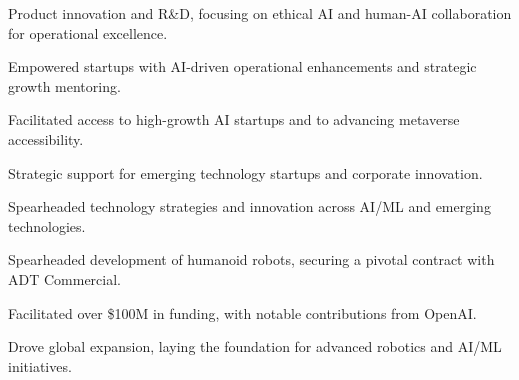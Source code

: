 \documentclass[11pt, letterpaper]{awesome-cv}
\begin{document}
\makecvheader

\begin{cventries}
    {
        \begin{cvitems}
            \item{Product innovation and R\&D, focusing on ethical AI and human-AI collaboration for operational excellence.}
        \end{cvitems}
    }

    {
        \begin{cvitems}
            \item{Empowered startups with AI-driven operational enhancements and strategic growth mentoring.}
            \item{Facilitated access to high-growth AI startups and to advancing metaverse accessibility.}
        \end{cvitems}
    }

    {
        \begin{cvitems}
            \item{Strategic support for emerging technology startups and corporate innovation.}
        \end{cvitems}
    }

    {
        \begin{cvitems}
            \item{Spearheaded technology strategies and innovation across AI/ML and emerging technologies.}
        \end{cvitems}
    }

    {
        \begin{cvitems}
            \item{Spearheaded development of humanoid robots, securing a pivotal contract with ADT Commercial.}
            \item{Facilitated over \$100M in funding, with notable contributions from OpenAI.}
            \item{Drove global expansion, laying the foundation for advanced robotics and AI/ML initiatives.}
        \end{cvitems}
    }


\end{cventries}
\end{document}
